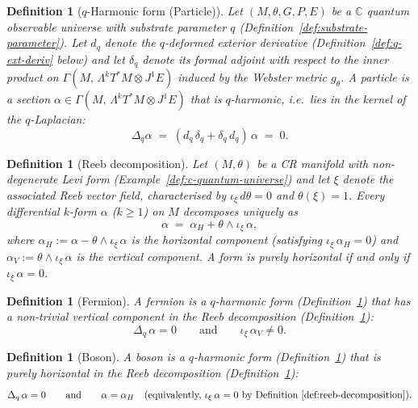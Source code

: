 \documentclass[12pt,a4paper]{report}
\newtheorem{definition}[theorem]{Definition}
\begin{document}
\begin{definition}[$q$-Harmonic form (Particle)]
\label{def:q-harmonic-form}
Let $(M, \theta, G, P, E)$ be a $\mathbb{C}$ quantum observable universe with
substrate parameter $q$ (Definition~\ref{def:substrate-parameter}).  Let $d_q$
denote the $q$-deformed exterior derivative
(Definition~\ref{def:q-ext-deriv} below) and let $\delta_q$ denote its formal
adjoint with respect to the inner product on
$\Gamma(M,\, \Lambda^k T^*M \otimes J^1 E)$ induced by the Webster metric
$g_\theta$.  A \emph{particle} is a section
$\alpha \in \Gamma(M,\, \Lambda^k T^*M \otimes J^1 E)$ that is
$q$-harmonic, i.e.\ lies in the kernel of the $q$-Laplacian:
\[
  \Delta_q \alpha
  \;=\; (d_q\,\delta_q + \delta_q\,d_q)\,\alpha
  \;=\; 0.
\]
\end{definition}

\begin{definition}[Reeb decomposition]
\label{def:reeb-decomposition}
Let $(M, \theta)$ be a CR manifold with non-degenerate Levi form
(Example~\ref{def:c-quantum-universe}) and let $\xi$ denote the
associated \emph{Reeb vector field}, characterised by
$\iota_\xi\,d\theta = 0$ and $\theta(\xi) = 1$.  Every differential
$k$-form $\alpha$ ($k \geq 1$) on $M$ decomposes uniquely as
\[
  \alpha \;=\; \alpha_H + \theta \wedge \iota_\xi\,\alpha,
\]
where $\alpha_H := \alpha - \theta \wedge \iota_\xi\,\alpha$ is the
\emph{horizontal component} (satisfying $\iota_\xi\,\alpha_H = 0$) and
$\alpha_V := \theta \wedge \iota_\xi\,\alpha$ is the \emph{vertical
component}.  A form is \emph{purely horizontal} if and only if
$\iota_\xi\,\alpha = 0$.
\end{definition}

\begin{definition}[Fermion]
\label{def:fermion}
A \emph{fermion} is a $q$-harmonic form
(Definition~\ref{def:q-harmonic-form}) that has a non-trivial vertical
component in the Reeb decomposition
(Definition~\ref{def:reeb-decomposition}):
\[
  \Delta_q\,\alpha = 0
  \qquad\text{and}\qquad
  \iota_\xi\,\alpha_V \neq 0.
\]
\end{definition}

\begin{definition}[Boson]
\label{def:boson}
A \emph{boson} is a $q$-harmonic form
(Definition~\ref{def:q-harmonic-form}) that is purely horizontal in the
Reeb decomposition (Definition~\ref{def:reeb-decomposition}):
\[
  \Delta_q\,\alpha = 0
  \qquad\text{and}\qquad
  \alpha = \alpha_H
  \quad(\text{equivalently, } \iota_\xi\,\alpha = 0
        \text{ by Definition~\ref{def:reeb-decomposition}}).
\]
\end{definition}
\end{document}
